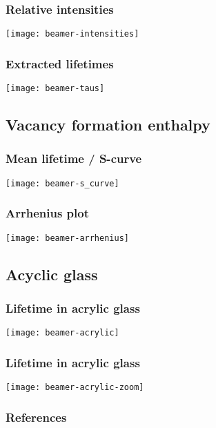 \documentclass[english, fleqn]{beamer}
\begin{document}
\begin{frame}
    \frametitle{Relative intensities}

    \centering
    \texttt{[image: beamer-intensities]}
\end{frame}

\begin{frame}
    \frametitle{Extracted lifetimes}

    \centering
    \texttt{[image: beamer-taus]}
\end{frame}

\subsection{Vacancy formation enthalpy}

\begin{frame}
    \frametitle{Mean lifetime / S-curve}

    \centering
    \texttt{[image: beamer-s\_curve]}
\end{frame}

\begin{frame}
    \frametitle{Arrhenius plot}

    \centering
    \texttt{[image: beamer-arrhenius]}
\end{frame}

\subsection{Acyclic glass}

\begin{frame}
    \frametitle{Lifetime in acrylic glass}
    \texttt{[image: beamer-acrylic]}
\end{frame}

\begin{frame}
    \frametitle{Lifetime in acrylic glass}
    \texttt{[image: beamer-acrylic-zoom]}
\end{frame}


\begin{frame}
    \frametitle{References}

    \printbibliography
\end{frame}
\end{document}
